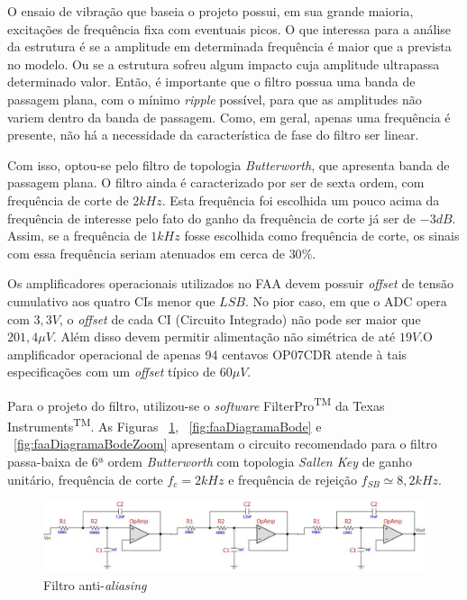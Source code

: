 \documentclass[
	12pt,				%
	openright,			%
	twoside,			%
	a4paper,			%
	english,			%
	french,				%
	spanish,			%
	brazil,				%
	]{abntex2}
\begin{document}
		O ensaio de vibração que baseia o projeto possui, em sua grande
		maioria, excitações de frequência fixa com eventuais picos. O que
		interessa para a análise da estrutura é se a amplitude em
		determinada frequência é maior que a prevista no modelo. Ou se a
		estrutura sofreu algum impacto cuja amplitude ultrapassa determinado
		valor. Então, é importante que o filtro possua uma banda de passagem
		plana, com o mínimo \textit{ripple} possível, para que as amplitudes não
		variem dentro da banda de passagem. Como, em geral, apenas uma
		frequência é presente, não há a necessidade da característica de
		fase do filtro ser linear.

		Com isso, optou-se pelo filtro de topologia
		\textit{Butterworth}, que apresenta banda de passagem plana. O
		filtro ainda é caracterizado por ser de sexta ordem, com
		frequência de corte de $2kHz$. Esta frequência foi escolhida um
		pouco acima da frequência de interesse pelo fato do ganho da
		frequência de corte já ser de $-3dB$. Assim, se a frequência de
		$1kHz$ fosse escolhida como frequência de corte, os sinais com
		essa frequência seriam atenuados em cerca de $30\%$.

		Os amplificadores operacionais utilizados no FAA devem
		possuir \textit{offset} de tensão cumulativo aos quatro CIs
		menor que $LSB$. No pior caso, em que o ADC opera com $3,3V$,
		o \textit{offset} de cada CI (Circuito Integrado) não pode ser
		maior que $201,4\mu V$. Além disso devem permitir alimentação
		não simétrica de até $19V$.O amplificador operacional de apenas
		94 centavos OP07CDR atende à tais especificações com um \textit{offset}
		típico de $60\mu V$.

		Para o projeto do filtro, utilizou-se o \textit{software}
		FilterPro\textsuperscript{TM} da Texas
		Instruments\textsuperscript{TM}. As Figuras ~\ref{fig:circuitoFAA},
		~\ref{fig:faaDiagramaBode} e ~\ref{fig:faaDiagramaBodeZoom} apresentam o
		circuito recomendado para o filtro passa-baixa de 6ª ordem
		\textit{Butterworth} com topologia \textit{Sallen Key} de ganho
		unitário, frequência de corte $f_c = 2kHz$ e frequência de
		rejeição $f_{SB}\simeq 8,2kHz$.

		\begin{figure}[!ht]
			\centering
			\includegraphics[width=\linewidth]{../Fotos/filterPro.jpg}
			\caption{Filtro anti-\textit{aliasing}}
			\label{fig:circuitoFAA}
		\end{figure}
\end{document}
